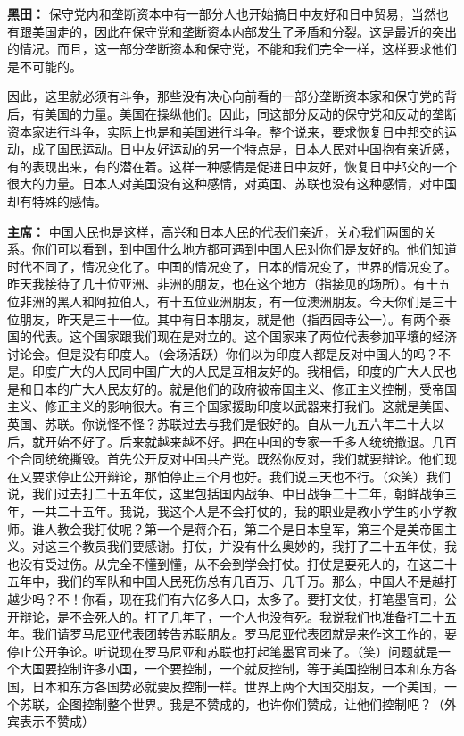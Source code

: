 \begin{duihua}
\item[\textbf{黑田：}] 保守党内和垄断资本中有一部分人也开始搞日中友好和日中贸易，当然也有跟美国走的，因此在保守党和垄断资本内部发生了矛盾和分裂。这是最近的突出的情况。而且，这一部分垄断资本和保守党，不能和我们完全一样，这样要求他们是不可能的。

因此，这里就必须有斗争，那些没有决心向前看的一部分垄断资本家和保守党的背后，有美国的力量。美国在操纵他们。因此，同这部分反动的保守党和反动的垄断资本家进行斗争，实际上也是和美国进行斗争。整个说来，要求恢复日中邦交的运动，成了国民运动。日中友好运动的另一个特点是，日本人民对中国抱有亲近感，有的表现出来，有的潜在着。这样一种感情是促进日中友好，恢复日中邦交的一个很大的力量。日本人对美国没有这种感情，对英国、苏联也没有这种感情，对中国却有特殊的感情。

\item[\textbf{主席：}] 中国人民也是这样，高兴和日本人民的代表们亲近，关心我们两国的关系。你们可以看到，到中国什么地方都可遇到中国人民对你们是友好的。他们知道时代不同了，情况变化了。中国的情况变了，日本的情况变了，世界的情况变了。昨天我接待了几十位亚洲、非洲的朋友，也在这个地方（指接见的场所）。有十五位非洲的黑人和阿拉伯人，有十五位亚洲朋友，有一位澳洲朋友。今天你们是三十位朋友，昨天是三十一位。其中有日本朋友，就是他（指西园寺公一）。有两个泰国的代表。这个国家跟我们现在是对立的。这个国家来了两位代表参加平壤的经济讨论会。但是没有印度人。（会场活跃）你们以为印度人都是反对中国人的吗？不是。印度广大的人民同中国广大的人民是互相友好的。我相信，印度的广大人民也是和日本的广大人民友好的。就是他们的政府被帝国主义、修正主义控制，受帝国主义、修正主义的影响很大。有三个国家援助印度以武器来打我们。这就是美国、英国、苏联。你说怪不怪？苏联过去与我们是很好的。自从一九五六年二十大以后，就开始不好了。后来就越来越不好。把在中国的专家一千多人统统撤退。几百个合同统统撕毁。首先公开反对中国共产党。既然你反对，我们就要辩论。他们现在又要求停止公开辩论，那怕停止三个月也好。我们说三天也不行。（众笑）我们说，我们过去打二十五年仗，这里包括国内战争、中日战争二十二年，朝鲜战争三年，一共二十五年。我说，我这个人是不会打仗的，我的职业是教小学生的小学教师。谁人教会我打仗呢？第一个是蒋介石，第二个是日本皇军，第三个是美帝国主义。对这三个教员我们要感谢。打仗，并没有什么奥妙的，我打了二十五年仗，我也没有受过伤。从完全不懂到懂，从不会到学会打仗。打仗是要死人的，在这二十五年中，我们的军队和中国人民死伤总有几百万、几千万。那么，中国人不是越打越少吗？不！你看，现在我们有六亿多人口，太多了。要打文仗，打笔墨官司，公开辩论，是不会死人的。打了几年了，一个人也没有死。我说我们也准备打二十五年。我们请罗马尼亚代表团转告苏联朋友。罗马尼亚代表团就是来作这工作的，要停止公开争论。听说现在罗马尼亚和苏联也打起笔墨官司来了。（笑）问题就是一个大国要控制许多小国，一个要控制，一个就反控制，等于美国控制日本和东方各国，日本和东方各国势必就要反控制一样。世界上两个大国交朋友，一个美国，一个苏联，企图控制整个世界。我是不赞成的，也许你们赞成，让他们控制吧？（外宾表示不赞成）


\end{duihua}
